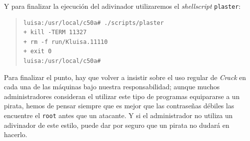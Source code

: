 Y para finalizar la ejecuci\'on del adivinador utilizaremos el {\it shellscript}
{\tt plaster}:
\begin{quote}
\begin{verbatim}
luisa:/usr/local/c50a# ./scripts/plaster 
+ kill -TERM 11327
+ rm -f run/Kluisa.11110
+ exit 0
luisa:/usr/local/c50a# 
\end{verbatim}
\end{quote}
Para finalizar el punto, hay que volver a insistir sobre el uso regular de
{\it Crack} en cada una de las m\'aquinas bajo nuestra responsabilidad; aunque
muchos administradores consideran el utilizar este tipo de programas equipararse
a un pirata, hemos de pensar siempre que es mejor que las contrase\~nas 
d\'ebiles las encuentre el {\tt root} antes que un atacante. Y si el 
administrador no utiliza un adivinador de este estilo, puede dar por seguro que
un pirata no dudar\'a en hacerlo.
